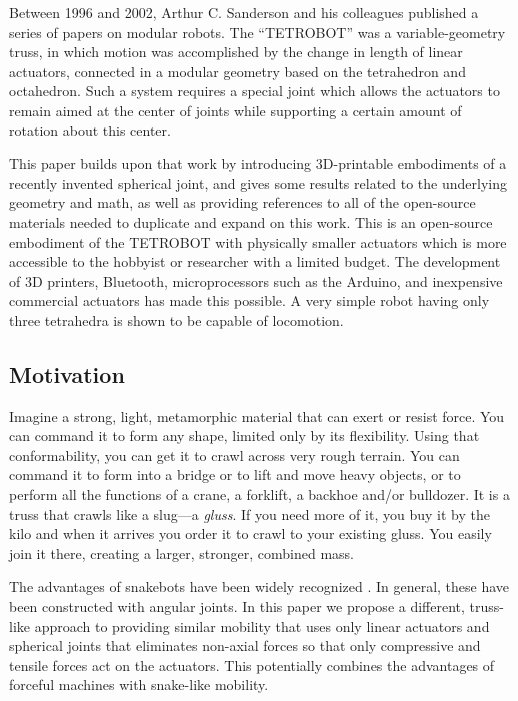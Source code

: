 \documentclass[11pt]{article}
\begin{document}
Between 1996 and 2002, Arthur C. Sanderson and his colleagues published a series of
papers\cite{sanderson1996modular,lee2002dynamic,lee1999dynamics} on modular robots.
The ``TETROBOT'' was a variable-geometry truss, in which motion was accomplished by the change
in length of linear actuators, connected in a modular geometry based on the tetrahedron and octahedron.
Such a system
requires a special joint which allows the actuators to remain aimed at the center of joints while supporting
a certain amount of rotation about this center.

This paper builds upon that work by 
introducing 3D-printable embodiments of
a recently invented spherical joint\cite{song2003spherical}, 
and gives some results related to the underlying geometry and math, as well as providing
references to all of the open-source materials needed to duplicate and expand on this work. This is an
open-source embodiment of the TETROBOT with physically smaller actuators which is more accessible to the
hobbyist or researcher with a limited budget.  The development of 3D printers, Bluetooth, microprocessors
such as the Arduino, and inexpensive commercial actuators has made this possible.
A very simple robot having only three tetrahedra is shown to be capable of locomotion.

\subsection{Motivation}

Imagine a strong, light, metamorphic material that can exert or resist force.
You can command it to form any shape, limited only by its flexibility.
Using that conformability, you can get it to crawl across very rough terrain.
You can command it to form into a bridge or to lift and move heavy objects,
or to perform all the functions of a crane, a forklift, a backhoe and/or bulldozer.
It is a truss that crawls like a slug---a \emph{gluss}.
If you need more of it, you buy it by the kilo and when it arrives you order it
to crawl to your existing gluss. You easily join it there, creating a
larger, stronger, combined mass.

The advantages of snakebots have been widely recognized \cite{liljebäck2012snake}.
In general, these have been constructed
with angular joints. In this paper we propose a different, truss-like approach to providing similar
mobility that uses only linear actuators and spherical joints that eliminates non-axial forces so that only
compressive and tensile forces act on the actuators.
This potentially combines the advantages of forceful machines with snake-like mobility.
\end{document}
